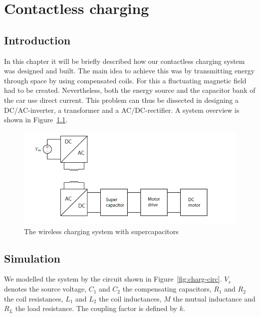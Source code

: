 \documentclass[11pt,titlepage]{report}
\begin{document}
\chapter{Contactless charging}
\section{Introduction}
In this chapter it will be briefly described how our contactless charging system was designed and built. The main idea to achieve this was by transmitting energy through space by using compensated coils. For this a fluctuating magnetic field had to be created. Nevertheless, both the energy source and the capacitor bank of the car use direct current. This problem can thus be dissected in designing a DC/AC-inverter, a transformer and a AC/DC-rectifier. A system overview is shown in Figure~\ref{fig:contactless-charging}.

\begin{figure}[H]
	\begin{center}
		\includegraphics[width=0.8\linewidth]{resource/contactless_charging.png}
	\end{center}
	\caption{The wireless charging system with supercapacitors}
	\label{fig:contactless-charging}
\end{figure}

\section{Simulation}
We modelled the system by the circuit shown in Figure~\ref{fig:charg-circ}. $V_s$ denotes the source voltage, $C_1$ and $C_2$ the compensating capacitors, $R_1$ and $R_2$ the coil resistances, $L_1$ and $L_2$ the coil inductances, $M$ the mutual inductance and $R_L$ the load resistance. The coupling factor is defined by $k$.
\end{document}
